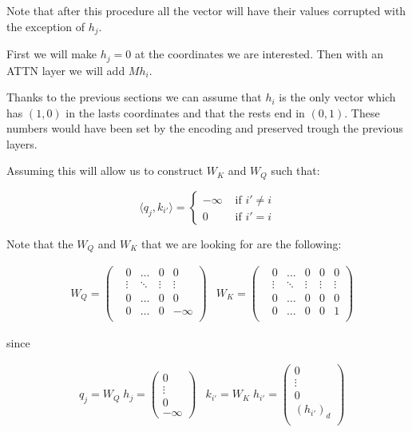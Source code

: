 Note that after this procedure all the vector will have their values corrupted with the exception of $h_j$.

\bigskip

First we will make $h_j = 0$ at the coordinates we are interested. Then with an ATTN layer we will add $M h_i$.

Thanks to the previous sections we can assume that $h_i$ is the only vector which has $(1,0)$ in the lasts coordinates and that the rests end in $(0,1)$. These numbers would have been set by the encoding and preserved trough the previous layers.

Assuming this will allow us to construct $W_K$ and $W_Q$ such that:

\[
\langle q_{j}, k_{i'} \rangle = \begin{cases}
    -\infty &\text{ if } i' \neq i \\
    0  &\text{ if } i' = i 
\end{cases}
\]

Note that the $W_Q$ and $W_K$ that we are looking for are the following:

\begin{align*}
    & W_Q = \left(\begin{matrix}
    &0      &\hdots &0      &0          \\
    &\vdots &\ddots &\vdots &\vdots     \\
    &0      &\hdots &0      &0          \\
    &0      &\hdots &0      &-\infty    \\
\end{matrix}\right)
    &W_K = \left(\begin{matrix}
    &0      &\hdots &0      &0      &0      \\
    &\vdots &\ddots &\vdots &\vdots &\vdots \\
    &0      &\hdots &0      &0      &0      \\
    &0      &\hdots &0      &0      &1      \\
\end{matrix}\right)
\end{align*}


since


\begin{align*}
    &q_{j} = W_Q \; h_j = \left(\begin{matrix}
        0 \\
        \vdots \\
        0 \\
        -\infty
    \end{matrix}\right)
    &k_{i'} = W_K \; h_{i'} = \left(\begin{matrix}
        0 \\
        \vdots \\
        0 \\
        (h_{i'})_{d} \\
    \end{matrix}\right)
\end{align*}

